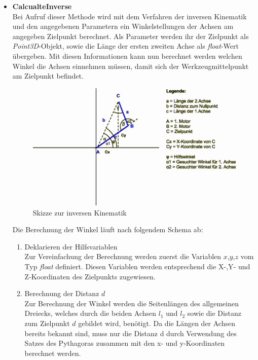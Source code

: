 \begin{itemize}
\item \textbf{CalcualteInverse}\\
Bei Aufruf dieser Methode wird mit dem Verfahren der inversen Kinematik und den angegebenen Parametern ein Winkelstellungen der Achsen am angegeben Zielpunkt berechnet. Als Parameter werden ihr der Zielpunkt als \textit{Point3D}-Objekt, sowie die Länge der ersten zweiten Achse als \textit{float}-Wert übergeben. Mit diesen Informationen kann nun berechnet werden welchen Winkel die Achsen einnehmen müssen, damit  sich der Werkzeugmittelpunkt am Zielpunkt befindet.\\
\begin{figure}[H]
  \centering
  \begin{minipage}[t]{12 cm}
  	\centering
  	\includegraphics[width=12cm]{images/Inverskinematik} 
    \caption{Skizze zur inversen Kinematik}
  \end{minipage}
\end{figure}
Die Berechnung der Winkel läuft nach folgendem Schema ab:
\begin{enumerate}
\item Deklarieren der Hilfsvariablen\\
Zur Vereinfachung der Berechnung werden zuerst die Variablen $x$,$y$,$z$ vom Typ \textit{float} definiert. Diesen Variablen werden entsprechend die X-,Y- und Z-Koordinaten des Zielpunkts zugewiesen.
\item Berechnung der Distanz $d$\\
Zur Berechnung der Winkel werden die Seitenlängen des allgemeinen Dreiecks, welches durch die beiden Achsen $l_1$ und $l_2$ sowie die Distanz zum Zielpunkt $d$ gebildet wird, benötigt. Da die Längen der Achsen bereits bekannt sind, muss nur die Distanz d durch Verwendung des Satzes des Pythagoras zusammen mit den x- und y-Koordinaten berechnet werden.\\

\end{enumerate}
\end{itemize}

